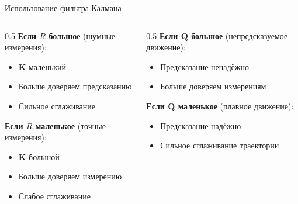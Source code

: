 \documentclass[aspectratio=169, 12pt]{beamer}
\begin{document}
\begin{frame}{Использование фильтра Калмана}
    \begin{columns}
        \begin{column}{0.5\textwidth}
            \textbf{Если $R$ большое} (шумные измерения):
            \begin{itemize}
                \item $\mathbf{K}$ маленький
                \item Больше доверяем предсказанию
                \item Сильное сглаживание
            \end{itemize}
            
            \vspace{0.5cm}
            \textbf{Если $R$ маленькое} (точные измерения):
            \begin{itemize}
                \item $\mathbf{K}$ большой
                \item Больше доверяем измерению
                \item Слабое сглаживание
            \end{itemize}
        \end{column}
        \begin{column}{0.5\textwidth}
            \textbf{Если $\mathbf{Q}$ большое} (непредсказуемое движение):
            \begin{itemize}
                \item Предсказание ненадёжно
                \item Больше доверяем измерениям
            \end{itemize}
            
            \vspace{0.5cm}
            \textbf{Если $\mathbf{Q}$ маленькое} (плавное движение):
            \begin{itemize}
                \item Предсказание надёжно
                \item Сильное сглаживание траектории
            \end{itemize}
        \end{column}
    \end{columns}
\end{frame}
\end{document}
